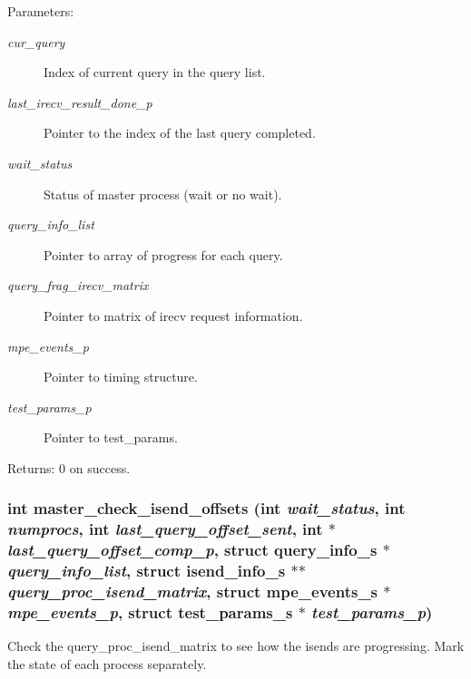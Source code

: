 \begin{Desc}
\item[Parameters:]
\begin{description}
\item[{\em cur\_\-query}]Index of current query in the query list. \item[{\em last\_\-irecv\_\-result\_\-done\_\-p}]Pointer to the index of the last query completed. \item[{\em wait\_\-status}]Status of master process (wait or no wait). \item[{\em query\_\-info\_\-list}]Pointer to array of progress for each query. \item[{\em query\_\-frag\_\-irecv\_\-matrix}]Pointer to matrix of irecv request information. \item[{\em mpe\_\-events\_\-p}]Pointer to timing structure. \item[{\em test\_\-params\_\-p}]Pointer to test\_\-params. \end{description}
\end{Desc}
\begin{Desc}
\item[Returns:]0 on success. \end{Desc}
\subsubsection{\setlength{\rightskip}{0pt plus 5cm}int master\_\-check\_\-isend\_\-offsets (int {\em wait\_\-status}, int {\em numprocs}, int {\em last\_\-query\_\-offset\_\-sent}, int $\ast$ {\em last\_\-query\_\-offset\_\-comp\_\-p}, struct \bf{query\_\-info\_\-s} $\ast$ {\em query\_\-info\_\-list}, struct \bf{isend\_\-info\_\-s} $\ast$$\ast$ {\em query\_\-proc\_\-isend\_\-matrix}, struct \bf{mpe\_\-events\_\-s} $\ast$ {\em mpe\_\-events\_\-p}, struct \bf{test\_\-params\_\-s} $\ast$ {\em test\_\-params\_\-p})}\label{master__help_8c_26e7ba48ee59e0d69e0b73a81e65e161}


Check the query\_\-proc\_\-isend\_\-matrix to see how the isends are progressing. Mark the state of each process separately.

